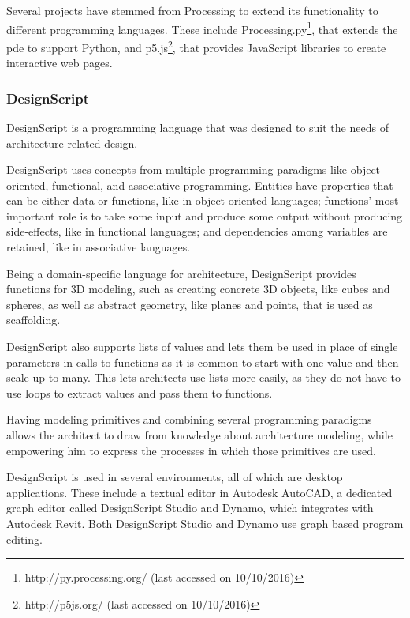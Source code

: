 Several projects have stemmed from Processing to extend its functionality to different programming languages.
These include Processing.py\footnote{http://py.processing.org/ (last accessed on 10/10/2016)}, that extends the \gls{pde} to support Python, and p5.js\footnote{http://p5js.org/ (last accessed on 10/10/2016)}, that provides JavaScript libraries to create interactive web pages.


\subsubsection{DesignScript}
\label{section:designscript:related}
DesignScript\cite{aish2012designscript} is a programming language that was designed to suit the needs of architecture related design.

DesignScript uses concepts from multiple programming paradigms like object-oriented, functional, and associative programming\cite{aish2012designscript}.
Entities have properties that can be either data or functions, like in object-oriented languages; functions' most important role is to take some input and produce some output without producing side-effects, like in functional languages; and dependencies among variables are retained, like in associative languages.

Being a domain-specific language for architecture, DesignScript provides functions for 3D modeling, such as creating concrete 3D objects, like cubes and spheres, as well as abstract geometry, like planes and points, that is used as scaffolding.

DesignScript also supports lists of values and lets them be used in place of single parameters in calls to functions as it is common to start with one value and then scale up to many.
This lets architects use lists more easily, as they do not have to use loops to extract values and pass them to functions.

Having modeling primitives and combining several programming paradigms allows the architect to draw from knowledge about architecture modeling, while empowering him to express the processes in which those primitives are used.

DesignScript is used in several environments, all of which are desktop applications.
These include a textual editor in Autodesk AutoCAD, a dedicated graph editor called DesignScript Studio and Dynamo, which integrates with Autodesk Revit.
Both DesignScript Studio and Dynamo use graph based program editing.


